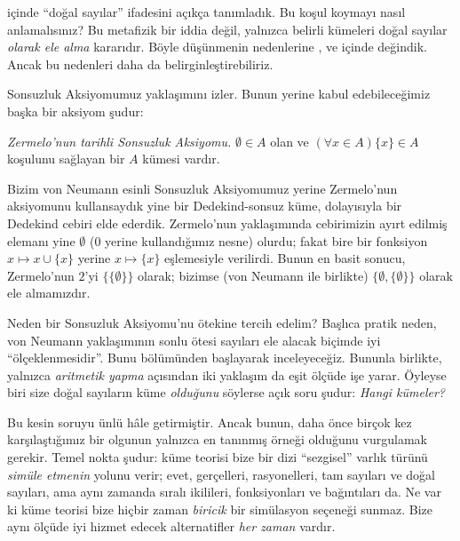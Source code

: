 
	


 içinde ``doğal sayılar'' ifadesini
açıkça tanımladık. Bu koşul koymayı nasıl anlamalısınız? Bu metafizik bir
iddia değil, yalnızca belirli kümeleri doğal sayılar \emph{olarak ele alma}
kararıdır. Böyle düşünmenin nedenlerine
,  ve
 içinde değindik. Ancak bu
nedenleri daha da belirginleştirebiliriz.

Sonsuzluk Aksiyomumuz \citet{VonNeumann1925} yaklaşımını izler. Bunun
yerine kabul edebileceğimiz başka bir aksiyom şudur:

\begin{defish}
\emph{Zermelo'nun \citeyear{Zermelo1908Untersuchungen} tarihli Sonsuzluk
Aksiyomu.} $\emptyset \in A$ olan ve
$(\forall x \in A)\{x\} \in A$ koşulunu sağlayan bir $A$ kümesi vardır.
\end{defish}

Bizim von Neumann esinli Sonsuzluk Aksiyomumuz yerine Zermelo'nun
aksiyomunu kullansaydık yine bir Dedekind-sonsuz küme, dolayısıyla bir
Dedekind cebiri elde ederdik. Zermelo'nun yaklaşımında cebirimizin ayırt
edilmiş elemanı yine $\emptyset$ ($0$ yerine kullandığımız nesne) olurdu;
fakat bire bir fonksiyon $x\mapsto x\cup\{x\}$ yerine
$x\mapsto\{x\}$ eşlemesiyle verilirdi. Bunun en basit sonucu, Zermelo'nun
$2$'yi $\{\{\emptyset\}\}$ olarak; bizimse (von Neumann ile birlikte)
$\{\emptyset,\{\emptyset\}\}$ olarak ele almamızdır.

Neden bir Sonsuzluk Aksiyomu'nu ötekine tercih edelim? Başlıca pratik
neden, von Neumann yaklaşımının sonlu ötesi sayıları ele alacak biçimde iyi
``ölçeklenmesidir''. Bunu  bölümünden başlayarak
inceleyeceğiz. Bununla birlikte, yalnızca \emph{aritmetik yapma} açısından
iki yaklaşım da eşit ölçüde işe yarar. Öyleyse biri size doğal sayıların
küme \emph{olduğunu} söylerse açık soru şudur: \emph{Hangi kümeler?}

Bu kesin soruyu \citet{Benacerraf1965} ünlü hâle getirmiştir. Ancak bunun,
daha önce birçok kez karşılaştığımız bir olgunun yalnızca en tanınmış örneği
olduğunu vurgulamak gerekir. Temel nokta şudur: küme teorisi bize bir dizi
``sezgisel'' varlık türünü \emph{simüle etmenin} yolunu verir; evet,
gerçelleri, rasyonelleri, tam sayıları ve doğal sayıları, ama aynı zamanda
sıralı ikilileri, fonksiyonları ve bağıntıları da. Ne var ki küme teorisi
bize hiçbir zaman \emph{biricik} bir simülasyon seçeneği sunmaz. Bize aynı
ölçüde iyi hizmet edecek alternatifler \emph{her zaman} vardır.

